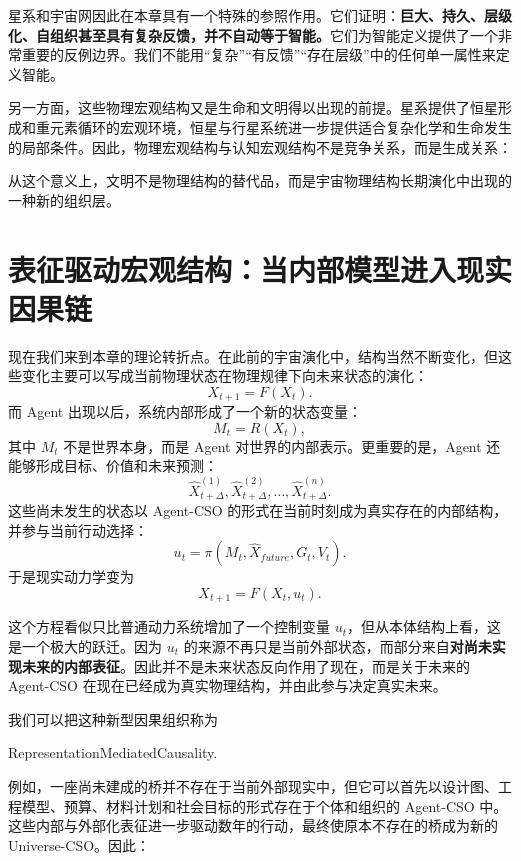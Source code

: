星系和宇宙网因此在本章具有一个特殊的参照作用。它们证明：\textbf{巨大、持久、层级化、自组织甚至具有复杂反馈，并不自动等于智能。}它们为智能定义提供了一个非常重要的反例边界。我们不能用“复杂”“有反馈”“存在层级”中的任何单一属性来定义智能。

另一方面，这些物理宏观结构又是生命和文明得以出现的前提。星系提供了恒星形成和重元素循环的宏观环境，恒星与行星系统进一步提供适合复杂化学和生命发生的局部条件。因此，物理宏观结构与认知宏观结构不是竞争关系，而是生成关系：
\begin{statementbox}
\centering
{}
\end{statementbox}
从这个意义上，文明不是物理结构的替代品，而是宇宙物理结构长期演化中出现的一种新的组织层。

\section{表征驱动宏观结构：当内部模型进入现实因果链}

现在我们来到本章的理论转折点。在此前的宇宙演化中，结构当然不断变化，但这些变化主要可以写成当前物理状态在物理规律下向未来状态的演化：
\[
X_{t+1}=F(X_t).
\]
而 Agent 出现以后，系统内部形成了一个新的状态变量：
\[
M_t=R(X_t),
\]
其中 $M_t$ 不是世界本身，而是 Agent 对世界的内部表示。更重要的是，Agent 还能够形成目标、价值和未来预测：
\[
\widehat{X}_{t+\Delta}^{(1)},
\widehat{X}_{t+\Delta}^{(2)},
\ldots,
\widehat{X}_{t+\Delta}^{(n)}.
\]
这些尚未发生的状态以 Agent-CSO 的形式在当前时刻成为真实存在的内部结构，并参与当前行动选择：
\[
u_t
=
\pi
\left(
M_t,
\widehat{X}_{future},
G_t,
V_t
\right).
\]
于是现实动力学变为
\[
X_{t+1}
=
F
\left(
X_t,u_t
\right).
\]

这个方程看似只比普通动力系统增加了一个控制变量 $u_t$，但从本体结构上看，这是一个极大的跃迁。因为 $u_t$ 的来源不再只是当前外部状态，而部分来自\textbf{对尚未实现未来的内部表征}。因此并不是未来状态反向作用了现在，而是关于未来的 Agent-CSO 在现在已经成为真实物理结构，并由此参与决定真实未来。

我们可以把这种新型因果组织称为
\begin{statementbox}
RepresentationMediatedCausality.
\end{statementbox}
例如，一座尚未建成的桥并不存在于当前外部现实中，但它可以首先以设计图、工程模型、预算、材料计划和社会目标的形式存在于个体和组织的 Agent-CSO 中。这些内部与外部化表征进一步驱动数年的行动，最终使原本不存在的桥成为新的 Universe-CSO。因此：
\begin{statementbox}
\centering
{}
\end{statementbox}

